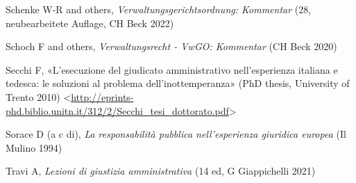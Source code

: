 \documentclass[12pt,it,a4paper,]{report}
\newlength{\cslhangindent}
\newenvironment{CSLReferences}[2] %
 {%
  \setlength{\parindent}{0pt}
  \ifodd #1 \everypar{\setlength{\hangindent}{\cslhangindent}}\ignorespaces\fi
  \ifnum #2 > 0
  \setlength{\parskip}{#2\baselineskip}
  \fi
 }%
 {}
\begin{document}
\begin{CSLReferences}{0}{0}
\leavevmode{}%
Schenke W-R and others, \emph{Verwaltungsgerichtsordnung: Kommentar}
(28, neubearbeitete Auflage, CH Beck 2022)

\leavevmode{}%
Schoch F and others, \emph{Verwaltungsrecht - VwGO: Kommentar} (CH Beck
2020)

\leavevmode{}%
Secchi F, {«L'esecuzione del giudicato amministrativo nell'esperienza
italiana e tedesca: le soluzioni al problema dell'inottemperanza»} (PhD
thesis, University of Trento 2010)
\textless{}\url{http://eprints-phd.biblio.unitn.it/312/2/Secchi_tesi_dottorato.pdf}\textgreater{}

\leavevmode{}%
Sorace D (a c di), \emph{La responsabilità pubblica nell'esperienza
giuridica europea} (Il Mulino 1994)

\leavevmode{}%
Travi A, \emph{Lezioni di giustizia amministrativa} (14 ed, G
Giappichelli 2021)

\end{CSLReferences}
\end{document}
